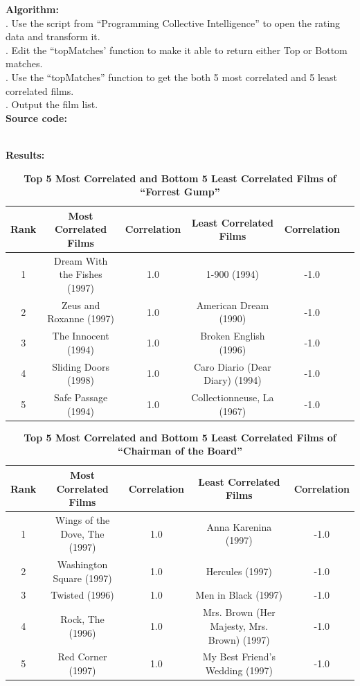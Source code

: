 \documentclass{article}
\begin{document}
		\noindent\textbf{Algorithm:}\\
		. Use the script from ``Programming Collective Intelligence'' to open the rating data and transform it.\\
		. Edit the ``topMatches' function to make it able to return either Top or Bottom matches.\\
		. Use the ``topMatches'' function to get the both 5 most correlated and 5 least correlated films.\\
		. Output the film list.\\

		\noindent\textbf{Source code:}
		

		\noindent\\\textbf{Results:}
		\begin{table}[!htb]
			\centering
			\caption{\textbf{Top 5 Most Correlated and Bottom 5 Least Correlated Films of ``Forrest Gump''}}
			\begin{tabular}{cccccc}
				\toprule
				\textbf{Rank} & \textbf{Most Correlated Films} & \textbf{Correlation} & \textbf{Least Correlated Films} & \textbf{Correlation}\\
				\midrule
				1 & Dream With the Fishes (1997) & 1.0 & 1-900 (1994) & -1.0\\
				2 & Zeus and Roxanne (1997) & 1.0 & American Dream (1990) & -1.0\\
				3 & The Innocent (1994) & 1.0 & Broken English (1996) & -1.0\\
				4 & Sliding Doors (1998) & 1.0 & Caro Diario (Dear Diary) (1994) & -1.0\\
				5 & Safe Passage (1994) & 1.0 & Collectionneuse, La (1967) & -1.0\\
				\bottomrule
			\end{tabular}
		\end{table}
		\begin{table}[!htb]
			\centering
			\caption{\textbf{Top 5 Most Correlated and Bottom 5 Least Correlated Films of ``Chairman of the Board''}}
			\begin{tabular}{ccccc}
				\toprule
				\textbf{Rank} & \textbf{Most Correlated Films} & \textbf{Correlation} & \textbf{Least Correlated Films} & \textbf{Correlation}\\
				\midrule
				1 & Wings of the Dove, The (1997) & 1.0 & Anna Karenina (1997) & -1.0\\
				2 & Washington Square (1997) & 1.0 & Hercules (1997) & -1.0\\
				3 & Twisted (1996) & 1.0 & Men in Black (1997) & -1.0\\
				4 & Rock, The (1996) & 1.0 & Mrs. Brown (Her Majesty, Mrs. Brown) (1997) & -1.0\\
				5 & Red Corner (1997) & 1.0 & My Best Friend's Wedding (1997) & -1.0\\
				\bottomrule
			\end{tabular}
		\end{table}
\end{document}
